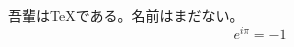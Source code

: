 \documentclass[12pt,dvipdfmx]{jsarticle}
\begin{document}
吾輩は\TeX である。名前はまだない。
\[e^{i\pi}=-1\]
\end{document}
